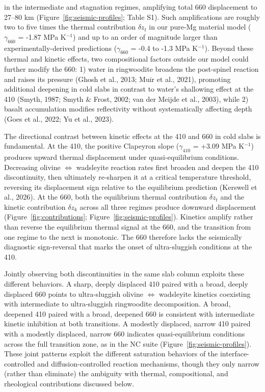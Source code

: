 \documentclass[draft,linenumbers]{agujournal2019}
\begin{document}
in the intermediate and stagnation regimes, amplifying total 660
displacement to 27--80 km (Figure~\ref{fig:seismic-profiles}; Table S1).
Such amplifications are roughly two to five times the thermal
contribution \(\delta z_t\) in our pure-Mg material model
(\(\gamma_{660}\) = -1.87 MPa K\(^{-1}\)) and up to an order of
magnitude larger than experimentally-derived predictions
(\(\gamma_{660}\) = -0.4 to -1.3 MPa K\(^{-1}\)). Beyond these thermal
and kinetic effects, two compositional factors outside our model could
further modify the 660: 1) water in ringwoodite broadens the post-spinel
reaction and raises its pressure (Ghosh et al., 2013; Muir et al.,
2021), promoting additional deepening in cold slabs in contrast to
water's shallowing effect at the 410 (Smyth, 1987; Smyth \& Frost, 2002;
{van der Meijde et al.}, 2003), while 2) basalt accumulation modifies
reflectivity without systematically affecting depth ({Goes et al.},
2022; {Yu et al.}, 2023).

The directional contrast between kinetic effects at the 410 and 660 in
cold slabs is fundamental. At the 410, the positive Clapeyron slope
(\(\gamma_{410}\) = +3.09 MPa K\(^{-1}\)) produces upward thermal
displacement under quasi-equilibrium conditions. Decreasing olivine
\(\Leftrightarrow\) wadsleyite reaction rates first broaden and deepen
the 410 discontinuity, then ultimately re-sharpen it at a critical
temperature threshold, reversing its displacement sign relative to the
equilibrium prediction (Kerswell et al., 2026). At the 660, both the
equilibrium thermal contribution \(\delta z_t\) and the kinetic
contribution \(\delta z_k\) across all three regimes produce downward
displacement (Figure~\ref{fig:contributions};
Figure~\ref{fig:seismic-profiles}). Kinetics amplify rather than reverse
the equilibrium thermal signal at the 660, and the transition from one
regime to the next is monotonic. The 660 therefore lacks the seismically
diagnostic sign-reversal that marks the onset of ultra-sluggish
conditions at the 410.

Jointly observing both discontinuities in the same slab column exploits
these different behaviors. A sharp, deeply displaced 410 paired with a
broad, deeply displaced 660 points to ultra-sluggish olivine
\(\Leftrightarrow\) wadsleyite kinetics coexisting with intermediate to
ultra-sluggish ringwoodite decomposition. A broad, deepened 410 paired
with a broad, deepened 660 is consistent with intermediate kinetic
inhibition at both transitions. A modestly displaced, narrow 410 paired
with a modestly displaced, narrow 660 indicates quasi-equilibrium
conditions across the full transition zone, as in the NC suite
(Figure~\ref{fig:seismic-profiles}). These joint patterns exploit the
different saturation behaviors of the interface-controlled and
diffusion-controlled reaction mechanisms, though they only narrow
(rather than eliminate) the ambiguity with thermal, compositional, and
rheological contributions discussed below.
\end{document}
